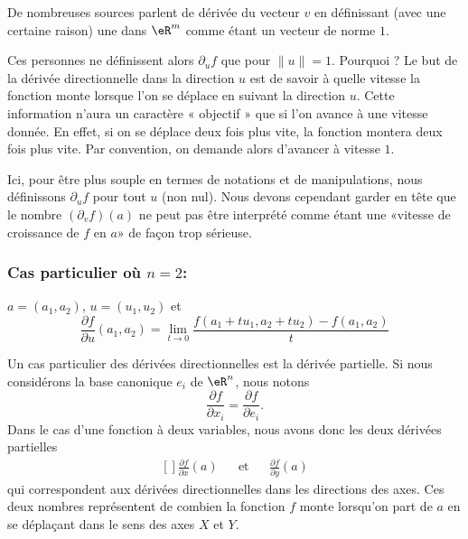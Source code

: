\begin{remark}
	De nombreuses sources parlent de dérivée  du vecteur \( v\) en définissant (avec une certaine raison) une  dans \( \eR^m\) comme étant un vecteur de norme \( 1\).

	Ces personnes ne définissent alors \( \partial_uf\) que pour \( \| u \|=1\). Pourquoi ? Le but de la dérivée directionnelle dans la direction \( u\) est de savoir à quelle vitesse la fonction monte lorsque l'on se déplace en suivant la direction \( u\). Cette information n'aura un caractère « objectif » que si l'on avance à une vitesse donnée. En effet, si on se déplace deux fois plus vite, la fonction montera deux fois plus vite. Par convention, on demande alors d'avancer à vitesse \( 1\).

	Ici, pour être plus souple en termes de notations et de manipulations, nous définissons \( \partial_uf\) pour tout \( u\) (non nul). Nous devons cependant garder en tête que le nombre \( (\partial_vf)(a)\) ne peut pas être interprété comme étant une «vitesse de croissance de \( f\) en \( a\)» de façon trop sérieuse.
\end{remark}

\subsubsection*{Cas particulier où \( n=2\):} \( a = (a_1, a_2)\), \( u =
(u_1,u_2)\) et
\begin{equation}
	\frac{\partial f}{\partial u}(a_1, a_2) = \lim_{t\rightarrow 0}\frac{f(a_1+tu_1,a_2+tu_2) - f(a_1, a_2)}{t}
\end{equation}

Un cas particulier des dérivées directionnelles est la dérivée partielle. Si nous considérons la base canonique \( e_i\) de \( \eR^n\), nous notons
\begin{equation}
	\frac{ \partial f }{ \partial x_i }=\frac{ \partial f }{ \partial e_i }.
\end{equation}
Dans le cas d'une fonction à deux variables, nous avons donc les deux dérivées partielles
\begin{equation}
	\begin{aligned}[]
		\frac{ \partial f }{ \partial x }(a) &  & \text{et} &  & \frac{ \partial f }{ \partial y }(a)
	\end{aligned}
\end{equation}
qui correspondent aux dérivées directionnelles dans les directions des axes. Ces deux nombres représentent de combien la fonction \( f\) monte lorsqu'on part de \( a\) en se déplaçant dans le sens des axes \( X\) et \( Y\).

